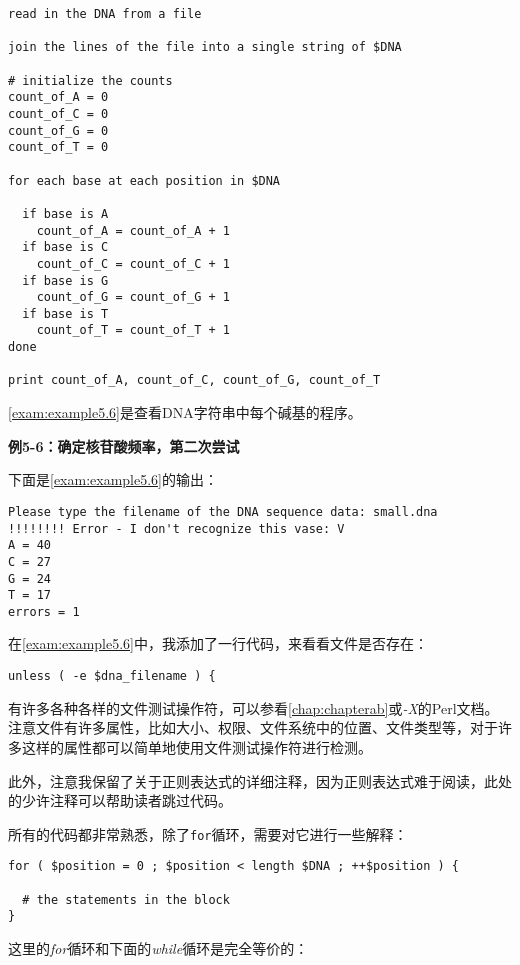 \begin{lstlisting}
read in the DNA from a file

join the lines of the file into a single string of $DNA

# initialize the counts
count_of_A = 0
count_of_C = 0
count_of_G = 0
count_of_T = 0

for each base at each position in $DNA

  if base is A
    count_of_A = count_of_A + 1
  if base is C
    count_of_C = count_of_C + 1
  if base is G
    count_of_G = count_of_G + 1
  if base is T
    count_of_T = count_of_T + 1
done

print count_of_A, count_of_C, count_of_G, count_of_T
\end{lstlisting}

\autoref{exam:example5.6}是查看DNA字符串中每个碱基的程序。

\textbf{例5-6：确定核苷酸频率，第二次尝试}


下面是\autoref{exam:example5.6}的输出：

\begin{lstlisting}
Please type the filename of the DNA sequence data: small.dna
!!!!!!!! Error - I don't recognize this vase: V
A = 40
C = 27
G = 24
T = 17
errors = 1
\end{lstlisting}

在\autoref{exam:example5.6}中，我添加了一行代码，来看看文件是否存在：

\begin{lstlisting}
unless ( -e $dna_filename ) {
\end{lstlisting}

有许多各种各样的文件测试操作符，可以参看\autoref{chap:chapterab}或\textit{-X}的Perl文档。注意文件有许多属性，比如大小、权限、文件系统中的位置、文件类型等，对于许多这样的属性都可以简单地使用文件测试操作符进行检测。

此外，注意我保留了关于正则表达式的详细注释，因为正则表达式难于阅读，此处的少许注释可以帮助读者跳过代码。

所有的代码都非常熟悉，除了\verb|for|循环，需要对它进行一些解释：

\begin{lstlisting}
for ( $position = 0 ; $position < length $DNA ; ++$position ) {
  
  # the statements in the block
}
\end{lstlisting}

这里的\textit{for}循环和下面的\textit{while}循环是完全等价的：

